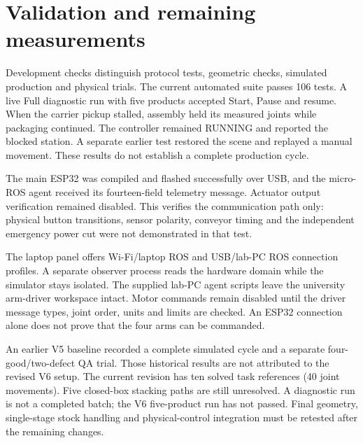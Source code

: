 \documentclass{article}
\begin{document}
\section{Validation and remaining measurements}
Development checks distinguish protocol tests, geometric checks, simulated production and physical trials. The current automated suite passes 106 tests. A live Full diagnostic run with five products accepted Start, Pause and resume. When the carrier pickup stalled, assembly held its measured joints while packaging continued. The controller remained RUNNING and reported the blocked station. A separate earlier test restored the scene and replayed a manual movement. These results do not establish a complete production cycle.

The main ESP32 was compiled and flashed successfully over USB, and the micro-ROS agent received its fourteen-field telemetry message. Actuator output verification remained disabled. This verifies the communication path only: physical button transitions, sensor polarity, conveyor timing and the independent emergency power cut were not demonstrated in that test.

The laptop panel offers Wi-Fi/laptop ROS and USB/lab-PC ROS connection profiles. A separate observer process reads the hardware domain while the simulator stays isolated. The supplied lab-PC agent scripts leave the university arm-driver workspace intact. Motor commands remain disabled until the driver message types, joint order, units and limits are checked. An ESP32 connection alone does not prove that the four arms can be commanded.

An earlier V5 baseline recorded a complete simulated cycle and a separate four-good/two-defect QA trial. Those historical results are not attributed to the revised V6 setup. The current revision has ten solved task references (40 joint movements). Five closed-box stacking paths are still unresolved. A diagnostic run is not a completed batch; the V6 five-product run has not passed. Final geometry, single-stage stock handling and physical-control integration must be retested after the remaining changes.
\end{document}
